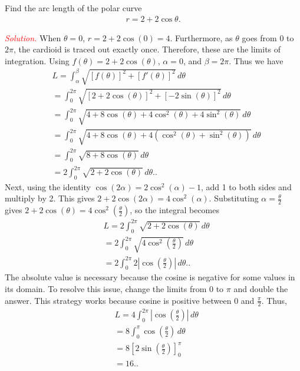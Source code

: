 \documentclass{report}
\begin{document}
     \bigbreak \noindent 
     \begin{exm}
         Find the arc length of the polar curve 
         \begin{align*}
             r = 2 + 2\cos{\theta }
         .\end{align*}
         
     \end{exm}
     \bigbreak \noindent 
     \textcolor{red}{\textit{Solution.}}
     When \( \theta = 0 \), \( r = 2 + 2\cos(0) = 4 \). Furthermore, as \( \theta \) goes from \( 0 \) to \( 2\pi \), the cardioid is traced out exactly once. Therefore, these are the limits of integration. Using \( f(\theta) = 2 + 2\cos(\theta) \), \( \alpha = 0 \), and \( \beta = 2\pi \). Thus we have
     \begin{align*}
          &L = \int_{\alpha}^{\beta} \sqrt{[f(\theta)]^2 + [f'(\theta)]^2} \, d\theta  \\
          &= \int_{0}^{2\pi} \sqrt{[2 + 2\cos(\theta)]^2 + [-2\sin(\theta)]^2} \, d\theta  \\
          &= \int_{0}^{2\pi} \sqrt{4 + 8\cos(\theta) + 4\cos^2(\theta) + 4\sin^2(\theta)} \, d\theta  \\
          &= \int_{0}^{2\pi} \sqrt{4 + 8\cos(\theta) + 4(\cos^2(\theta) + \sin^2(\theta))} \, d\theta  \\
          &= \int_{0}^{2\pi} \sqrt{8 + 8\cos(\theta)} \, d\theta  \\
          &= 2 \int_{0}^{2\pi} \sqrt{2 + 2\cos(\theta)} \, d\theta.
     .\end{align*}
     Next, using the identity \( \cos(2\alpha) = 2\cos^2(\alpha) - 1 \), add 1 to both sides and multiply by 2. This gives \( 2 + 2\cos(2\alpha) = 4\cos^2(\alpha) \). Substituting \( \alpha = \frac{\theta}{2} \) gives \( 2 + 2\cos(\theta) = 4\cos^2\left(\frac{\theta}{2}\right) \), so the integral becomes
     \begin{align*}
          &L = 2 \int_{0}^{2\pi} \sqrt{2 + 2\cos(\theta)} \, d\theta  \\
          &= 2 \int_{0}^{2\pi} \sqrt{4\cos^2\left(\frac{\theta}{2}\right)} \, d\theta  \\
          &= 2 \int_{0}^{2\pi} 2 \left| \cos\left(\frac{\theta}{2}\right) \right| \, d\theta. 
     .\end{align*}
     The absolute value is necessary because the cosine is negative for some values in its domain. To resolve this issue, change the limits from \( 0 \) to \( \pi \) and double the answer. This strategy works because cosine is positive between \( 0 \) and \( \frac{\pi}{2} \). Thus,
     \begin{align*}
          &L = 4 \int_{0}^{2\pi} \left| \cos\left(\frac{\theta}{2}\right) \right| \, d\theta  \\
          &= 8 \int_{0}^{\pi} \cos\left(\frac{\theta}{2}\right) \, d\theta  \\
          &= 8 \left[ 2\sin\left(\frac{\theta}{2}\right) \right]_{0}^{\pi}  \\
          &= 16. 
     .\end{align*}






     
     




   


    
    
\end{document}

